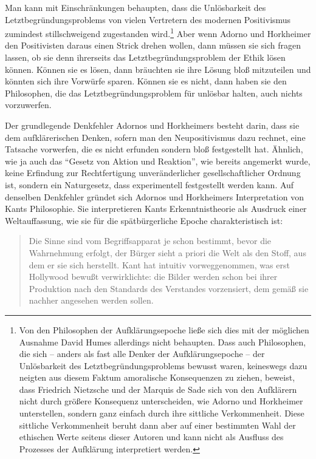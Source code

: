 \documentclass[12pt,a4paper,ngerman]{article}
\begin{document}
Man kann mit Einschränkungen behaupten, dass die Unlösbarkeit des
Letztbegründungsproblems von vielen Vertretern des modernen
Positivismus zumindest stillschweigend zugestanden wird.\footnote{Von
  den Philosophen der Aufklärungsepoche ließe sich dies mit der
  möglichen Ausnahme David Humes allerdings nicht behaupten. Dass auch
  Philosophen, die sich -- anders als fast alle Denker der
  Aufklärungsepoche -- der Unlösbarkeit des Letztbegründungsproblems
  bewusst waren, keineswegs dazu neigten aus diesem Faktum amoralische
  Konsequenzen zu ziehen, beweist, dass Friedrich Nietzsche und der
  Marquis de Sade sich von den Aufklärern nicht durch größere
  Konsequenz unterscheiden, wie Adorno und Horkheimer unterstellen,
  sondern ganz einfach durch ihre sittliche Verkommenheit. Diese
  sittliche Verkommenheit beruht dann aber auf einer bestimmten Wahl
  der ethischen Werte seitens dieser Autoren und kann nicht als
  Ausfluss des Prozesses der Aufklärung interpretiert werden.} Aber
wenn Adorno und Horkheimer den Positivisten daraus einen Strick drehen
wollen, dann müssen sie sich fragen lassen, ob sie denn ihrerseits das
Letztbegründungsproblem der Ethik lösen können. Können sie es lösen,
dann bräuchten sie ihre Lösung bloß mitzuteilen und könnten sich ihre
Vorwürfe sparen. Können sie es nicht, dann haben sie den Philosophen,
die das Letztbegründungsproblem für unlösbar halten, auch nichts
vorzuwerfen. 

Der grundlegende Denkfehler Adornos und Horkheimers
besteht darin, dass sie dem aufklärerischen Denken, sofern
man den Neupositivismus dazu rechnet, eine Tatsache vorwerfen, die es
nicht erfunden sondern bloß festgestellt hat.  Ähnlich, wie ja auch
das "`Gesetz von Aktion und Reaktion"', wie bereits angemerkt wurde,
keine Erfindung zur Rechtfertigung unveränderlicher gesellschaftlicher
Ordnung ist, sondern ein Naturgesetz, dass experimentell festgestellt
werden kann.  Auf denselben Denkfehler gründet sich Adornos und
Horkheimers Interpretation von Kants Philosophie. Sie interpretieren
Kants Erkenntnistheorie als Ausdruck einer Weltauffassung, wie sie für
die spätbürgerliche Epoche charakteristisch ist:

\begin{quotation}

Die Sinne sind vom Begriffsapparat je schon bestimmt, bevor die Wahrnehmung
erfolgt, der Bürger sieht a priori die Welt als den Stoff, aus dem er sie sich
herstellt. Kant hat intuitiv vorweggenommen, was erst Hollywood bewußt
verwirklichte: die Bilder werden schon bei ihrer Produktion nach den Standards
des Verstandes vorzensiert, dem gemäß sie nachher angesehen werden
sollen. \cite[S. 91]{adorno-horkheimer:1947}

\end{quotation}
\end{document}

